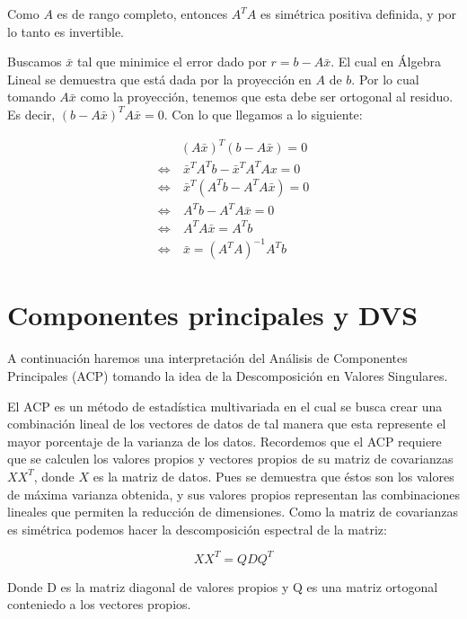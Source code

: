 \documentclass[12pt]{article}
\begin{document}
Como $A$ es de rango completo, entonces $A^TA$ es simétrica positiva definida, y por lo tanto es invertible.

Buscamos $\bar x$ tal que minimice el error dado por $r = b - A\bar x$. El cual en Álgebra Lineal se demuestra que está dada por la proyección en $A$ de $b$. Por lo cual tomando $A\bar x$ como la proyección, tenemos que esta debe ser ortogonal al residuo. Es decir, $(b - A\bar x)^TA\bar x = 0$. Con lo que llegamos a lo siguiente:

\begin{align*}
& (A\bar x)^T(b - A\bar x) = 0\\
\Leftrightarrow & \ \bar x^TA^Tb - \bar x^TA^TAx = 0\\
\Leftrightarrow & \ \bar x^T (A^Tb - A^TA\bar x) = 0\\
\Leftrightarrow & \ A^Tb - A^TA\bar x = 0\\
\Leftrightarrow & \ A^TA\bar x = A^Tb\\
\Leftrightarrow & \ \bar x = (A^TA)^{-1}A^Tb
\end{align*}



\section{Componentes principales y DVS}

A continuación haremos una interpretación del Análisis de Componentes Principales (ACP) tomando la idea de la Descomposición en Valores Singulares.

El ACP es un método de estadística multivariada en el cual se busca crear una combinación lineal de los vectores de datos de tal manera que esta represente el mayor porcentaje de la varianza de los datos. Recordemos que el ACP requiere que se calculen los valores propios y vectores propios de su matriz de covarianzas $XX^T$, donde $X$ es la matriz de datos. Pues se demuestra que éstos son los valores de máxima varianza obtenida, y sus valores propios representan las combinaciones lineales que permiten la reducción de dimensiones. Como la matriz de covarianzas es simétrica podemos hacer la descomposición espectral de la matriz:

$$XX^T = QDQ^T$$

Donde D es la matriz diagonal de valores propios y Q es una matriz ortogonal conteniedo a los vectores propios.
\end{document}
